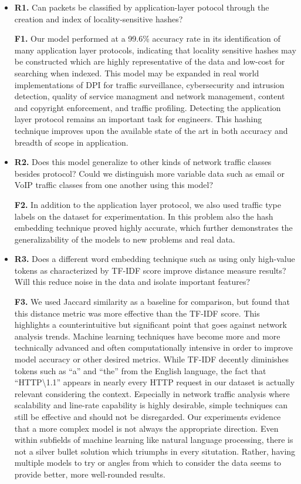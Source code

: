 \begin{itemize}
\item\textbf{R1.} Can packets be classified by application-layer potocol through the creation and index of locality-sensitive hashes?

\textbf{F1.} Our model performed at a 99.6\% accuracy rate in its identification of many application layer protocols, indicating that locality sensitive hashes may be constructed which are highly representative of the data and low-cost for searching when indexed. This model may be expanded in real world implementations of DPI for traffic surveillance, cybersecurity and intrusion detection, quality of service managment and network management, content and copyright enforcement, and traffic profiling. Detecting the application layer protocol remains an important task for engineers. This hashing technique improves upon the available state of the art in both accuracy and breadth of scope in application.

\item\textbf{R2.} Does this model generalize to other kinds of network traffic classes besides protocol? Could we distinguish more variable data such as email or VoIP traffic classes from one another using this model?

\textbf{F2.} In addition to the application layer protocol, we also used traffic type labels on the dataset for experimentation. In this problem also the hash embedding technique proved highly accurate, which further demonstrates the generalizability of the models to new problems and real data.

\item\textbf{R3.} Does a different word embedding technique such as using only high-value tokens as characterized by TF-IDF score improve distance measure results? Will this reduce noise in the data and isolate important features?

\textbf{F3.} We used Jaccard similarity as a baseline for comparison, but found that this distance metric was more effective than the TF-IDF score. This highlights a counterintuitive but significant point that goes against network analysis trends. Machine learning techniques have become more and more technically advanced and often computationally intensive in order to improve model accuracy or other desired metrics. While TF-IDF decently diminishes tokens such as ``a'' and ``the'' from the English language, the fact that ``\textsc{HTTP\textbackslash1.1}'' appears in nearly every HTTP request in our dataset is actually relevant considering the context. Especially in network traffic analysis where scalability and line-rate capability is highly desirable, simple techniques can still be effective and should not be disregarded. Our experiments evidence that a more complex model is not always the appropriate direction. Even within subfields of machine learning like natural language processing, there is not a silver bullet solution which triumphs in every situtation. Rather, having multiple models to try or angles from which to consider the data seems to provide better, more well-rounded results.


\end{itemize}
